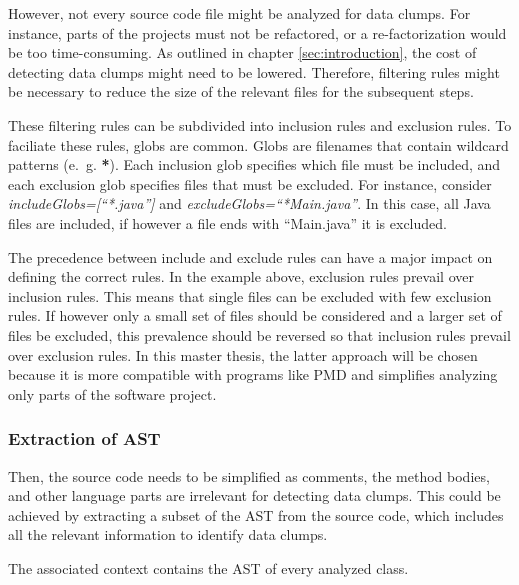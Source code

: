However, not every source code file might be analyzed for data clumps. For instance, parts of the projects must not be refactored, or a re-factorization would be too time-consuming. As outlined in chapter \ref{sec:introduction}, the cost of detecting data clumps might need to be lowered. Therefore, filtering rules might be necessary to reduce the size of the relevant files for the subsequent steps.  

These filtering rules can be subdivided into inclusion rules and exclusion rules.  To faciliate these rules, globs are common.  Globs are filenames that contain wildcard patterns (e.~g. \textbf{*}). Each inclusion glob specifies which file must be included, and each exclusion glob specifies files that must be excluded. For instance, consider \textit{includeGlobs=[\enquote{*.java}]} and \textit{excludeGlobs=\enquote{*Main.java}}. In this case, all Java files are included, if however a file ends with \enquote{Main.java} it is excluded. 

The precedence between include and exclude rules can have a major impact on defining the correct rules. In the example above, exclusion rules prevail over inclusion rules.  This means that single files can be excluded with few exclusion rules. If however only a small set of files should be considered and a larger set of files be excluded, this prevalence should be reversed so that inclusion rules prevail over exclusion rules. In this master thesis, the latter approach will be chosen because it is more compatible with programs like PMD and simplifies analyzing only parts of the software project. 

\subsubsection{Extraction of AST}
Then,  the source code needs to be simplified as comments, the method bodies, and other language parts are irrelevant for detecting data clumps. This could be achieved by extracting a subset of the \ac{AST} from the source code, which includes all the relevant information to identify data clumps.

The associated context contains the \ac{AST} of every analyzed class.
\begin{comment}
\subsubsection{Similarity detection}

The next step is finding pairs of method parameters and pairs of identical or at least similar fields. For this, the identifier and the data type can be compared. Unequal variable names might not rule out a similarity between two variables. For instance, typos may happen, or synonyms may be used. Also, the type might be different. For instance, the data type \textit{double} can be seen as a super-set of the datatype \textit{int} because every 32-bit integer can be converted to a \textit{double}.

From this, a graph can be constructed that visualizes the relationship of the several variables. A node represents a parameter or field value, while an edge exists if and only if a relationship between two variables is detected. 
\end{comment}

